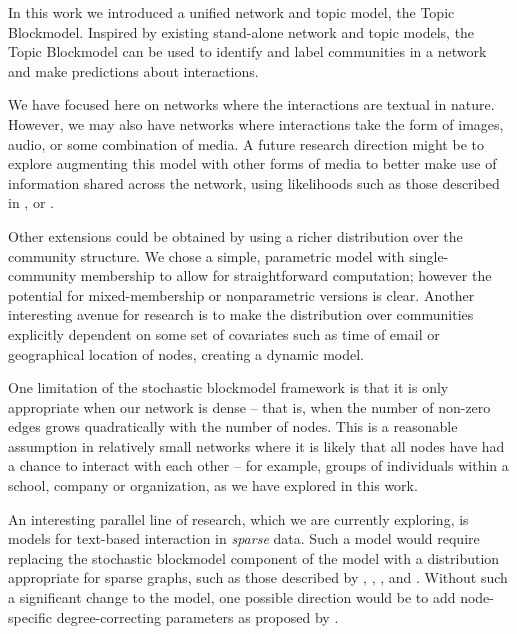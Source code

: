    In this work we introduced a unified network and topic model, the Topic Blockmodel. Inspired by existing stand-alone network and topic models, the Topic Blockmodel can be used to identify and label communities in a network and make predictions about interactions. %
    
    We have focused here on networks where the interactions are textual in nature. However, we may also have networks where interactions take the form of images, audio, or some combination of media. A future research direction might be to explore augmenting this model with other forms of media to better make use of information shared across the network, using likelihoods such as those described in \citep{cao2007spatially}, \citep{niu2012context} or \citep{kim2009acoustic}.
    
    Other extensions could be obtained by using a richer distribution over the community structure. We chose a simple, parametric model with single-community membership to allow for straightforward computation; however the potential for mixed-membership or nonparametric versions is clear. Another interesting avenue for research is to make the distribution over communities explicitly dependent on some set of covariates such as time of email or geographical location of nodes, creating a dynamic model.

    One limitation of the stochastic blockmodel framework is that it is only appropriate when our network is dense -- that is, when the number of non-zero edges grows quadratically with the number of nodes. This is a reasonable assumption in relatively small networks where it is likely that all nodes have had a chance to interact with each other -- for example, groups of individuals within a school, company or organization, as we have explored in this work.
    
    An interesting parallel line of research, which we are currently exploring, is models for text-based interaction in \textit{sparse} data. Such a model would require replacing the stochastic blockmodel component of the model with a distribution appropriate for sparse graphs, such as those described by \citep{Caron:Fox:2014}, \citep{Veitch:Roy:2015}, \citep{Cai:Campbell:Broderick:2016}, \citep{Crane:Dempsey:2016} and \citep{williamson2016nonparametric}. Without such a significant change to the model, one possible direction would be to add node-specific degree-correcting parameters as proposed by \citep{Karrer:Newman:2011}.


